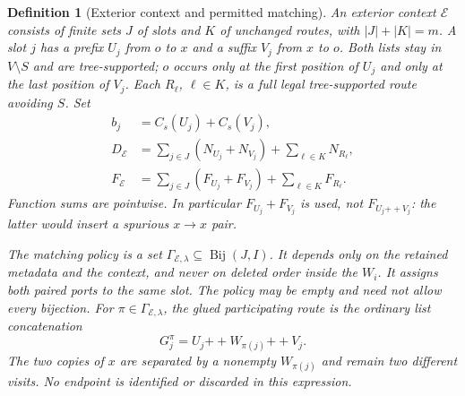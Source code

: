 \documentclass[11pt]{article}
\newtheorem{definition}{Definition}[section]
\theoremstyle{remark}
\newcommand{\cat}{\mathbin{+\!+}}
\newcommand{\Bij}{\operatorname{Bij}}
\begin{document}
\begin{definition}[Exterior context and permitted matching]
\label{def:context}
An exterior context $\mathcal E$ consists of finite sets $J$ of slots and $K$
of unchanged routes, with $|J|+|K|=m$. A slot $j$ has a prefix $U_j$ from $o$
to $x$ and a suffix $V_j$ from $x$ to $o$. Both lists stay in $V\setminus S$
and are tree-supported; $o$ occurs only at the first position of $U_j$ and
only at the last position of $V_j$. Each $R_\ell$, $\ell\in K$, is a full
legal tree-supported route avoiding $S$. Set
\begin{align*}
 b_j&=C_s(U_j)+C_s(V_j),\\
 D_{\mathcal E}&=\sum_{j\in J}(N_{U_j}+N_{V_j})
                 +\sum_{\ell\in K}N_{R_\ell},\\
 F_{\mathcal E}&=\sum_{j\in J}(F_{U_j}+F_{V_j})
                 +\sum_{\ell\in K}F_{R_\ell}.
\end{align*}
Function sums are pointwise. In particular $F_{U_j}+F_{V_j}$ is used, not
$F_{U_j\cat V_j}$: the latter would insert a spurious $x\to x$ pair.

The matching policy is a set
$\Gamma_{\mathcal E,\lambda}\subseteq\Bij(J,I)$. It depends only on the
retained metadata and the context, and never on deleted order inside the
$W_i$. It assigns both paired ports to the same slot. The policy may be empty
and need not allow every bijection. For $\pi\in\Gamma_{\mathcal E,\lambda}$,
the glued participating route is the ordinary list concatenation
\[
 G_j^\pi=U_j\cat W_{\pi(j)}\cat V_j.
\]
The two copies of $x$ are separated by a nonempty $W_{\pi(j)}$ and remain two
different visits. No endpoint is identified or discarded in this expression.
\end{definition}
\end{document}
